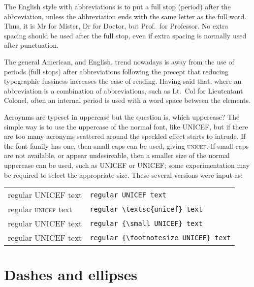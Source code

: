 \documentclass[10pt,a4paper,oneside,extrafontsizes]{memoir}%
\begin{document}
\begin{paracol}{2}
\switchEng
    The English style with abbreviations is to put a full stop (period) after
the abbreviation, unless the abbreviation ends with the same letter as the
full word. Thus, it is Mr for Mister, Dr for Doctor, but Prof.~for Professor.
No extra spacing should be used after the full stop, even if extra
spacing is normally used after punctuation.

    The general American, and English, trend nowadays is away from the use 
of periods (full stops) after abbreviations following the precept that
reducing typographic fussiness increases the ease of reading. Having said that,
where an abbreviation is a combination of abbreviations, such as Lt.~Col for
Lieutentant Colonel, often an internal period is used with a word space
between the elements.

    Acroynms are typeset in uppercase but the 
question is, which uppercase?
The simple way is to use the uppercase of the normal font, like UNICEF, but
if there are too many acronyms scattered around the speckled effect starts
to intrude. If the font family has one, then small caps can be used,
giving \textsc{unicef}. If small caps are not available, or appear
undesireable, then a smaller size of the normal uppercase can be used,
such as {\small UNICEF} or {\footnotesize UNICEF}; some experimentation
may be required to select the appropriate size. These several versions
were input as:\par
\begin{tabular}{ll}
regular UNICEF text & \verb?regular UNICEF text? \\
regular \textsc{unicef} text & \verb?regular \textsc{unicef} text? \\
regular {\small UNICEF} text & \verb?regular {\small UNICEF} text? \\
regular {\footnotesize UNICEF} text & \verb?regular {\footnotesize UNICEF} text? 
\end{tabular}
\end{paracol}

\section{Dashes and ellipses}
\end{document}
